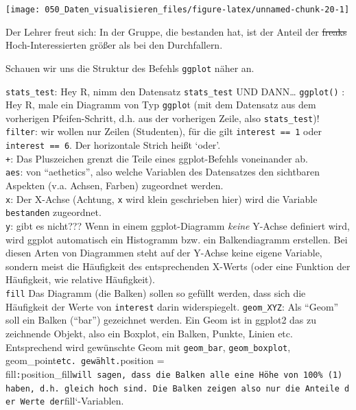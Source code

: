 \documentclass[12pt,ngerman,]{book}
\theoremstyle{definition}
\theoremstyle{definition}
\theoremstyle{remark}
\let\BeginKnitrBlock\begin \let\EndKnitrBlock\end
\begin{document}
\begin{center}\texttt{[image: 050\_Daten\_visualisieren\_files/figure-latex/unnamed-chunk-20-1]} \end{center}

Der Lehrer freut sich: In der Gruppe, die bestanden hat, ist der Anteil
der \sout{freaks} Hoch-Interessierten größer als bei den Durchfallern.

Schauen wir uns die Struktur des Befehls \texttt{ggplot} näher an.

\BeginKnitrBlock{rmdpseudocode}
\texttt{stats\_test}: Hey R, nimm den Datensatz \texttt{stats\_test} UND
DANN\ldots{} \texttt{ggplot()} : Hey R, male ein Diagramm von Typ
\texttt{ggplo}t (mit dem Datensatz aus dem vorherigen Pfeifen-Schritt,
d.h. aus der vorherigen Zeile, also \texttt{stats\_test})!\\
\texttt{filter}: wir wollen nur Zeilen (Studenten), für die gilt
\texttt{interest\ ==\ 1} oder \texttt{interest\ ==\ 6}. Der horizontale
Strich heißt `oder'.\\
\texttt{+}: Das Pluszeichen grenzt die Teile eines ggplot-Befehls
voneinander ab.\\
\texttt{aes}: von ``aethetics'', also welche Variablen des Datensatzes
den sichtbaren Aspekten (v.a. Achsen, Farben) zugeordnet werden.\\
\texttt{x}: Der X-Achse (Achtung, \texttt{x} wird klein geschrieben
hier) wird die Variable \texttt{bestanden} zugeordnet.\\
\texttt{y}: gibt es nicht??? Wenn in einem ggplot-Diagramm \emph{keine}
Y-Achse definiert wird, wird ggplot automatisch ein Histogramm bzw. ein
Balkendiagramm erstellen. Bei diesen Arten von Diagrammen steht auf der
Y-Achse keine eigene Variable, sondern meist die Häufigkeit des
entsprechenden X-Werts (oder eine Funktion der Häufigkeit, wie relative
Häufigkeit).\\
\texttt{fill} Das Diagramm (die Balken) sollen so gefüllt werden, dass
sich die Häufigkeit der Werte von \texttt{interest} darin widerspiegelt.
\texttt{geom\_XYZ}: Als ``Geom'' soll ein Balken (``bar'') gezeichnet
werden. Ein Geom ist in ggplot2 das zu zeichnende Objekt, also ein
Boxplot, ein Balken, Punkte, Linien etc. Entsprechend wird gewünschte
Geom mit \texttt{geom\_bar}, \texttt{geom\_boxplot},
geom\_point\texttt{etc.\ gewählt.}position =
fill\texttt{:}position\_fill\texttt{will\ sagen,\ dass\ die\ Balken\ alle\ eine\ Höhe\ von\ 100\%\ (1)\ haben,\ d.h.\ gleich\ hoch\ sind.\ Die\ Balken\ zeigen\ also\ nur\ die\ Anteile\ der\ Werte\ der}fill`-Variablen.
\EndKnitrBlock{rmdpseudocode}
\end{document}
